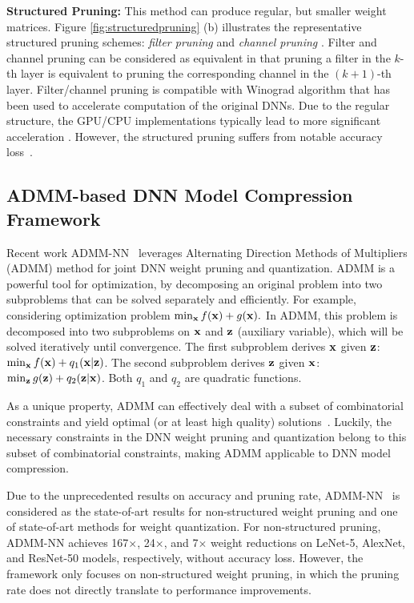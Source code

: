 \documentclass[sigplan,screen]{acmart}
\begin{document}
{\bf Structured Pruning: }
This method can produce regular,
but smaller weight matrices.
{Figure \ref{fig:structuredpruning} (b)} illustrates the representative structured pruning schemes: \emph{filter pruning} and \emph{channel pruning} \cite{wen2016learning}. 
Filter and channel pruning can be considered as equivalent in that pruning a filter in the $k$-th layer is equivalent to pruning the corresponding channel in the $(k+1)$-th layer. Filter/channel pruning is compatible with Winograd algorithm \cite{winograd1980arithmetic,lavin2016fast} 
that has been used to accelerate 
computation of the original DNNs. 
Due to the regular structure, 
the GPU/CPU implementations typically lead to more significant acceleration \cite{mao2017exploring,wen2016learning,he2017channel}.
However, the structured pruning suffers from notable accuracy loss~\cite{wen2016learning,he2017channel}.

\subsection{ADMM-based DNN Model Compression Framework}

Recent work ADMM-NN~\cite{ren2019ADMMNN,ye2019progressive} 
leverages Alternating Direction Methods of Multipliers (ADMM) method for joint DNN weight pruning and quantization. 
ADMM is a powerful tool for optimization, by decomposing an original problem into two subproblems that can be solved separately and efficiently. For example, considering optimization problem $\min_{\bf{x}} f({\bf{x}})+g({\bf{x}}).$ In ADMM, this problem is decomposed into two subproblems on $\bf{x}$ and $\bf{z}$ (auxiliary variable), which will be solved iteratively until convergence. The first subproblem derives $\bf{x}$ given $\bf{z}$: $\min_{\bf{x}} f({\bf{x}})+q_1(\bf{x}|\bf{z})$. The second subproblem derives $\bf{z}$ given $\bf{x}$: $\min_{\bf{z}} g({\bf{z}})+q_2(\bf{z}|\bf{x})$. Both $q_1$ and $q_2$ are quadratic functions.

As a unique property, ADMM can effectively deal with a subset of combinatorial constraints and yield optimal (or at least high quality) solutions~\cite{hong2016convergence,liu2018zeroth}. Luckily, the necessary constraints in the DNN weight pruning and quantization belong to this subset of combinatorial constraints, 
making ADMM applicable to DNN model compression.

Due to the unprecedented results on accuracy 
and pruning rate, ADMM-NN~\cite{ren2019ADMMNN} 
is considered as the state-of-art results for
non-structured weight pruning 
and one of state-of-art methods for weight quantization. 
For non-structured pruning, ADMM-NN achieves 167$\times$, 24$\times$, and 7$\times$ weight reductions on LeNet-5, AlexNet, and ResNet-50 models, respectively, without accuracy loss. However, the framework only focuses on non-structured weight pruning, in which the pruning rate does
not directly translate to performance improvements.
\end{document}
